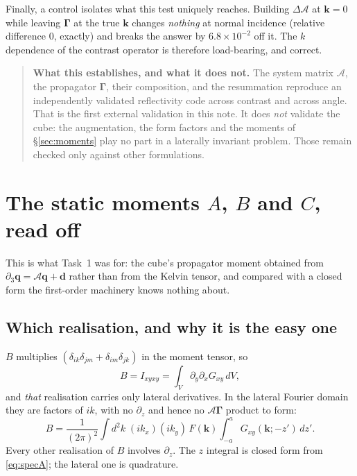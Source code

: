 \documentclass[11pt,a4paper]{article}
\newcommand{\bq}{\mathbf{q}}
\newcommand{\bd}{\mathbf{d}}
\newcommand{\Aop}{\mathcal{A}}
\newcommand{\dA}{\Delta\mathcal{A}}
\begin{document}
Finally, a control isolates what this test uniquely reaches.  Building $\dA$ at
$\mathbf{k}=0$ while leaving $\boldsymbol\Gamma$ at the true $\mathbf{k}$ changes
\emph{nothing} at normal incidence (relative difference $0$, exactly) and breaks
the answer by $6.8\times10^{-2}$ off it.  The $k$ dependence of the contrast
operator is therefore load-bearing, and correct.

\begin{quote}
\textbf{What this establishes, and what it does not.}  The system matrix $\Aop$,
the propagator $\boldsymbol\Gamma$, their composition, and the resummation
reproduce an independently validated reflectivity code across contrast and
across angle.  That is the first external validation in this note.  It does
\emph{not} validate the cube: the augmentation, the form factors and the moments
of \S\ref{sec:moments} play no part in a laterally invariant problem.  Those
remain checked only against other formulations.
\end{quote}

\section{The static moments \texorpdfstring{$A$, $B$ and $C$}{A, B and C},
read off}\label{sec:bmoment}

This is what Task~1 was for: the cube's propagator moment obtained from
$\partial_3\bq = \Aop\bq + \bd$ rather than from the Kelvin tensor, and compared
with a closed form the first-order machinery knows nothing about.

\subsection{Which realisation, and why it is the easy one}

$B$ multiplies $(\delta_{ik}\delta_{jm} + \delta_{im}\delta_{jk})$ in the moment
tensor, so
\begin{equation}\label{eq:brealise}
  B = I_{xyxy} = \int_V \partial_y\partial_x G_{xy}\,dV ,
\end{equation}
and \emph{that} realisation carries only lateral derivatives.  In the lateral
Fourier domain they are factors of $ik$, with no $\partial_z$ and hence no
$\Aop\boldsymbol\Gamma$ product to form:
\begin{equation}\label{eq:bintegral}
  B = \frac{1}{(2\pi)^2}\int\! d^2k\;(ik_x)(ik_y)\,F(\mathbf{k})
      \int_{-a}^{a}\! G_{xy}(\mathbf{k}; -z')\,dz' .
\end{equation}
Every other realisation of $B$ involves $\partial_z$.  The $z$ integral is closed
form from \eqref{eq:specA}; the lateral one is quadrature.
\end{document}
